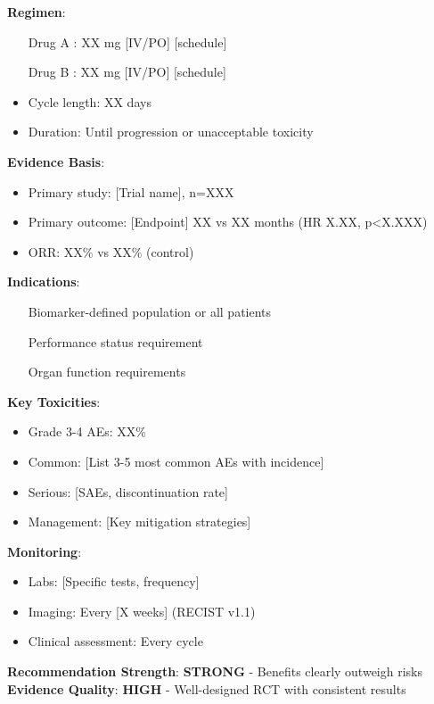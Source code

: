 \documentclass[10pt,letterpaper]{article}
\begin{document}
\begin{tcolorbox}[enhanced,colback=stronggreen!10,colframe=stronggreen,
title={\textbf{Option 1: [Regimen Name]} \hfill \colorbox{white}{\textbf{STRONG (1A)}}},
fonttitle=\bfseries\small,coltitle=black]
{\small
\textbf{Regimen}:
\begin{itemize}
\item [Drug A]: XX mg [IV/PO] [schedule]
\item [Drug B]: XX mg [IV/PO] [schedule]
\item Cycle length: XX days
\item Duration: Until progression or unacceptable toxicity
\end{itemize}

\textbf{Evidence Basis}:
\begin{itemize}
\item Primary study: [Trial name], n=XXX
\item Primary outcome: [Endpoint] XX vs XX months (HR X.XX, p<X.XXX)
\item ORR: XX\% vs XX\% (control)
\end{itemize}

\textbf{Indications}:
\begin{itemize}
\item [Biomarker-defined population or all patients]
\item [Performance status requirement]
\item [Organ function requirements]
\end{itemize}

\textbf{Key Toxicities}:
\begin{itemize}
\item Grade 3-4 AEs: XX\%
\item Common: [List 3-5 most common AEs with incidence]
\item Serious: [SAEs, discontinuation rate]
\item Management: [Key mitigation strategies]
\end{itemize}

\textbf{Monitoring}:
\begin{itemize}
\item Labs: [Specific tests, frequency]
\item Imaging: Every [X weeks] (RECIST v1.1)
\item Clinical assessment: Every cycle
\end{itemize}

\textbf{Recommendation Strength}: \textbf{STRONG} - Benefits clearly outweigh risks\\
\textbf{Evidence Quality}: \textbf{HIGH} - Well-designed RCT with consistent results
}
\end{tcolorbox}
\end{document}
